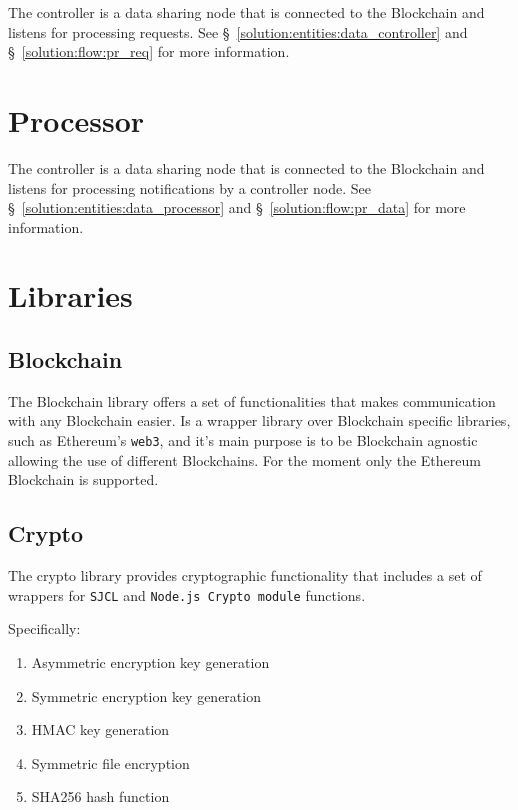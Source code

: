 The controller is a data sharing node that is connected to the Blockchain and listens for processing requests. See §~\ref{solution:entities:data_controller} and §~\ref{solution:flow:pr_req} for more information.

\section{Processor}
\label{implemenation:processor}

The controller is a data sharing node that is connected to the Blockchain and listens for processing notifications by a controller node.  See §~\ref{solution:entities:data_processor} and §~\ref{solution:flow:pr_data} for more information.

\section{Libraries}
\label{implemenation:libs}

\subsection{Blockchain}
\label{implemenation:libs:bl}

The Blockchain library offers a set of functionalities that makes communication with any Blockchain easier. Is a wrapper library over Blockchain specific libraries, such as Ethereum's \verb|web3|, and it's main purpose is to be Blockchain agnostic allowing the use of different Blockchains. For the moment only the Ethereum Blockchain is supported.

\subsection{Crypto}
\label{implemenation:libs:cr}

The crypto library provides cryptographic functionality that includes a set of wrappers for \verb|SJCL| and \verb|Node.js Crypto module| functions.

Specifically:

\begin{enumerate}
  \item Asymmetric encryption key generation
  \item Symmetric encryption key generation
  \item HMAC key generation
  \item Symmetric file encryption
  \item SHA256 hash function
\end{enumerate}

